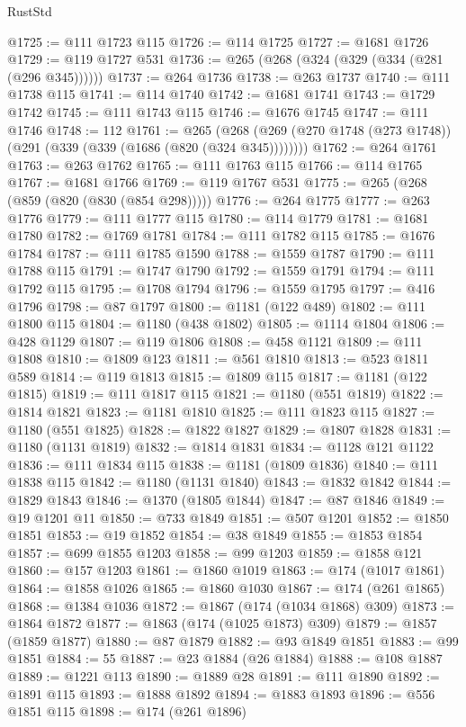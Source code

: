 \begin{lexlean}{RustStd}
\begin{coremodule}
{\begin{coremodule}
{{{{{{{{{{{{{{{{{{{{{{{{{{{{{{{{{{{{{{{{{{{{{{{{{{{{{{{{{{{{{{{{{{{{{{{{{{{{{{@1725 := @111 @1723 @115
@1726 := @114 @1725
@1727 := @1681 @1726
@1729 := @119 @1727 @531
@1736 := @265 (@268 (@324 (@329 (@334 (@281 (@296 @345))))))
@1737 := @264 @1736
@1738 := @263 @1737
@1740 := @111 @1738 @115
@1741 := @114 @1740
@1742 := @1681 @1741
@1743 := @1729 @1742
@1745 := @111 @1743 @115
@1746 := @1676 @1745
@1747 := @111 @1746
@1748 := 112
@1761 := @265
    (@268 (@269 (@270 @1748 (@273 @1748)) (@291 (@339 (@339 (@1686 (@820 (@324 @345))))))))
@1762 := @264 @1761
@1763 := @263 @1762
@1765 := @111 @1763 @115
@1766 := @114 @1765
@1767 := @1681 @1766
@1769 := @119 @1767 @531
@1775 := @265 (@268 (@859 (@820 (@830 (@854 @298)))))
@1776 := @264 @1775
@1777 := @263 @1776
@1779 := @111 @1777 @115
@1780 := @114 @1779
@1781 := @1681 @1780
@1782 := @1769 @1781
@1784 := @111 @1782 @115
@1785 := @1676 @1784
@1787 := @111 @1785 @1590
@1788 := @1559 @1787
@1790 := @111 @1788 @115
@1791 := @1747 @1790
@1792 := @1559 @1791
@1794 := @111 @1792 @115
@1795 := @1708 @1794
@1796 := @1559 @1795
@1797 := @416 @1796
@1798 := @87 @1797
@1800 := @1181 (@122 @489)
@1802 := @111 @1800 @115
@1804 := @1180 (@438 @1802)
@1805 := @1114 @1804
@1806 := @428 @1129
@1807 := @119 @1806
@1808 := @458 @1121
@1809 := @111 @1808
@1810 := @1809 @123
@1811 := @561 @1810
@1813 := @523 @1811 @589
@1814 := @119 @1813
@1815 := @1809 @115
@1817 := @1181 (@122 @1815)
@1819 := @111 @1817 @115
@1821 := @1180 (@551 @1819)
@1822 := @1814 @1821
@1823 := @1181 @1810
@1825 := @111 @1823 @115
@1827 := @1180 (@551 @1825)
@1828 := @1822 @1827
@1829 := @1807 @1828
@1831 := @1180 (@1131 @1819)
@1832 := @1814 @1831
@1834 := @1128 @121 @1122
@1836 := @111 @1834 @115
@1838 := @1181 (@1809 @1836)
@1840 := @111 @1838 @115
@1842 := @1180 (@1131 @1840)
@1843 := @1832 @1842
@1844 := @1829 @1843
@1846 := @1370 (@1805 @1844)
@1847 := @87 @1846
@1849 := @19 @1201 @11
@1850 := @733 @1849
@1851 := @507 @1201
@1852 := @1850 @1851
@1853 := @19 @1852
@1854 := @38 @1849
@1855 := @1853 @1854
@1857 := @699 @1855 @1203
@1858 := @99 @1203
@1859 := @1858 @121
@1860 := @157 @1203
@1861 := @1860 @1019
@1863 := @174 (@1017 @1861)
@1864 := @1858 @1026
@1865 := @1860 @1030
@1867 := @174 (@261 @1865)
@1868 := @1384 @1036
@1872 := @1867 (@174 (@1034 @1868) @309)
@1873 := @1864 @1872
@1877 := @1863 (@174 (@1025 @1873) @309)
@1879 := @1857 (@1859 @1877)
@1880 := @87 @1879
@1882 := @93 @1849 @1851
@1883 := @99 @1851
@1884 := 55
@1887 := @23 @1884 (@26 @1884)
@1888 := @108 @1887
@1889 := @1221 @113
@1890 := @1889 @28
@1891 := @111 @1890
@1892 := @1891 @115
@1893 := @1888 @1892
@1894 := @1883 @1893
@1896 := @556 @1851 @115
@1898 := @174 (@261 @1896)
}}}}}}}}}}}}}}}}}}}}}}}}}}}}}}}}}}}}}}}}}}}}}}}}}}}}}}}}}}}}}}}}}}}}}}}}}}}}}}
\end{coremodule}}
\end{coremodule}
\end{lexlean}
